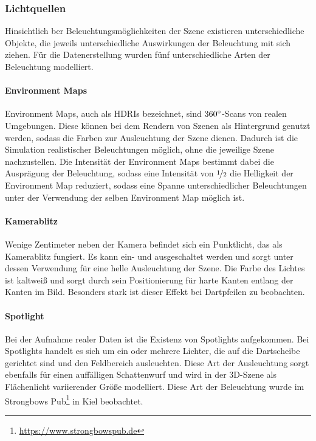 \subsubsection{Lichtquellen}
\label{sec:lichter}

Hinsichtlich ber Beleuchtungsmöglichkeiten der Szene existieren unterschiedliche Objekte, die jeweils unterschiedliche Auswirkungen der Beleuchtung mit sich ziehen. Für die Datenerstellung wurden fünf unterschiedliche Arten der Beleuchtung modelliert.

\paragraph{Environment Maps}

Environment Maps, auch als HDRIs bezeichnet, sind $360^{\circ}$-Scans von realen Umgebungen. Diese können bei dem Rendern von Szenen als Hintergrund genutzt werden, sodass die Farben zur Ausleuchtung der Szene dienen. Dadurch ist die Simulation realistischer Beleuchtungen möglich, ohne die jeweilige Szene nachzustellen. Die Intensität der Environment Maps bestimmt dabei die Ausprägung der Beleuchtung, sodass eine Intensität von $\nicefrac{1}{2}$ die Helligkeit der Environment Map reduziert, sodass eine Spanne unterschiedlicher Beleuchtungen unter der Verwendung der selben Environment Map möglich ist.

\paragraph{Kamerablitz}

Wenige Zentimeter neben der Kamera befindet sich ein Punktlicht, das als Kamerablitz fungiert. Es kann ein- und ausgeschaltet werden und sorgt unter dessen Verwendung für eine helle Ausleuchtung der Szene. Die Farbe des Lichtes ist kaltweiß und sorgt durch sein Positionierung für harte Kanten entlang der Kanten im Bild. Besonders stark ist dieser Effekt bei Dartpfeilen zu beobachten.

\paragraph{Spotlight}

Bei der Aufnahme realer Daten ist die Existenz von Spotlights aufgekommen. Bei Spotlights handelt es sich um ein oder mehrere Lichter, die auf die Dartscheibe gerichtet sind und den Feldbereich ausleuchten. Diese Art der Ausleuchtung sorgt ebenfalls für einen auffälligen Schattenwurf und wird in der 3D-Szene als Flächenlicht variierender Größe modelliert. Diese Art der Beleuchtung wurde im Strongbows Pub\footnote{\url{https://www.strongbowspub.de}} in Kiel beobachtet.

